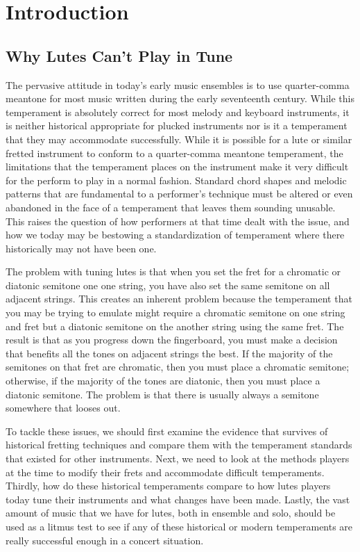 
\chapter{Introduction}

\section{Why Lutes Can't Play in Tune}

The pervasive attitude in today's early music ensembles is to use quarter-comma
meantone for most music written during the early seventeenth century.
While this temperament is absolutely correct for most melody and keyboard
instruments, it is neither historical appropriate for plucked instruments nor is
it a temperament that they may accommodate successfully.  While it is possible
for a lute or similar fretted instrument to conform to a quarter-comma meantone
temperament, the limitations that the temperament places on the instrument make
it very difficult for the perform to play in a normal fashion.  Standard chord
shapes and melodic patterns that are fundamental to a performer's technique must
be altered or even abandoned in the face of a temperament that leaves them
sounding unusable.  This raises the question of how performers at that time
dealt with the issue, and how we today may be bestowing a standardization of
temperament where there historically may not have been one.

The problem with tuning lutes is that when you set the fret for a chromatic or
diatonic semitone one one string, you have also set the same semitone on all
adjacent strings.  This creates an inherent problem because the temperament that
you may be trying to emulate might require a chromatic semitone on one string
and fret but a diatonic semitone on the another string using the same fret.  The
result is that as you progress down the fingerboard, you must make a decision
that benefits all the tones on adjacent strings the best. \autocite[120]{RD:1}
If the majority of the semitones on that fret are chromatic, then you must place
a chromatic semitone; otherwise, if the majority of the tones are diatonic, then
you must place a diatonic semitone.  The problem is that there is usually always
a semitone somewhere that looses out.

To tackle these issues, we should first examine the evidence that survives of
historical fretting techniques and compare them with the temperament standards
that existed for other instruments.  Next, we need to look at the methods
players at the time to modify their frets and accommodate difficult
temperaments.  Thirdly, how do these historical temperaments compare to how
lutes players today tune their instruments and what changes have been made.
Lastly, the vast amount of music that we have for lutes, both in ensemble and
solo, should be used as a litmus test to see if any of these historical or
modern temperaments are really successful enough in a concert situation.
\autocite[130]{RD:1}

